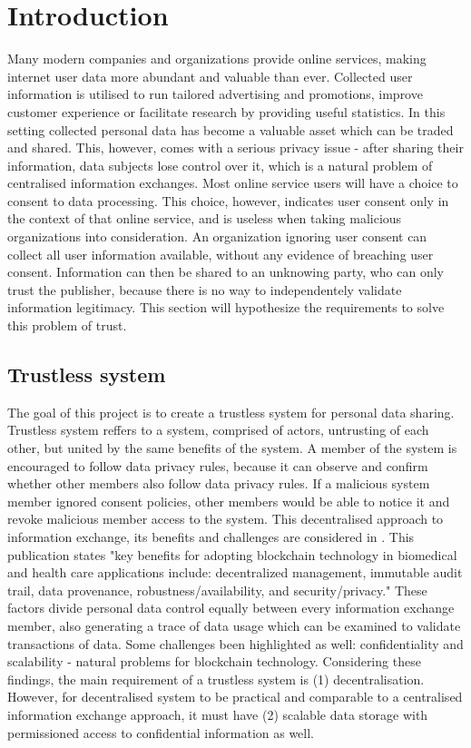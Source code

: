 \documentclass[12pt]{article}
\begin{document}
    \newpage
    \tableofcontents

    
    \newpage
    \section{Introduction}
    Many modern companies and organizations provide online services, making internet user data more abundant and valuable than ever. Collected user information is utilised to run tailored advertising and promotions, improve customer experience or facilitate research by providing useful statistics. In this setting collected personal data has become a valuable asset which can be traded and shared. This, however, comes with a serious privacy issue - after sharing their information, data subjects lose control over it, which is a natural problem of centralised information exchanges. Most online service users will have a choice to consent to data processing. This choice, however, indicates user consent only in the context of that online service, and is useless when taking malicious organizations into consideration. An organization ignoring user consent can collect all user information available, without any evidence of breaching user consent. Information can then be shared to an unknowing party, who can only trust the publisher, because there is no way to independentely validate information legitimacy. This section will hypothesize the requirements to solve this problem of trust.

    \subsection{Trustless system}
    The goal of this project is to create a trustless system for personal data sharing. Trustless system reffers to a system, comprised of actors, untrusting of each other, but united by the same benefits of the system. A member of the system is encouraged to follow data privacy rules, because it can observe and confirm whether other members also follow data privacy rules. If a malicious system member ignored consent policies, other members would be able to notice it and revoke malicious member access to the system. This decentralised approach to information exchange, its benefits and challenges are considered in \cite{dlt}. This publication states "key benefits for adopting blockchain technology in biomedical and health care applications include: decentralized management, immutable audit trail, data provenance, robustness/availability, and security/privacy."\cite{dlt} These factors divide personal data control equally between every information exchange member, also generating a trace of data usage which can be examined to validate transactions of data. Some challenges been highlighted as well: confidentiality and scalability - natural problems for blockchain technology. Considering these findings, the main requirement of a trustless system is (1) decentralisation. However, for decentralised system to be practical and comparable to a centralised information exchange approach, it must have (2) scalable data storage with permissioned access to confidential information as well.
\end{document}
